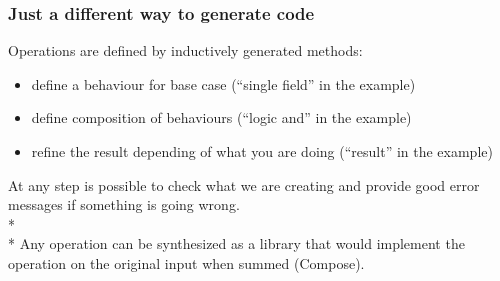 \begin{frame}[fragile]
\frametitle{Just a different way to generate code}
Operations are defined by inductively generated methods:
\begin{itemize}
\PresentationOnly\pause\item define a behaviour for base case (``single field'' in the example)
\PresentationOnly\pause\item define composition of behaviours (``logic and'' in the example)
\PresentationOnly\pause\item refine the result depending of what you are doing (``result'' in the example) 
\end{itemize}
\PresentationOnly\pause At any step is possible to check what we are creating and provide good error messages if something is going wrong.\\*${}_{}$\\*
Any operation can be synthesized as a library that would implement the operation on the original input when summed (Compose).

\end{frame}


%
%




